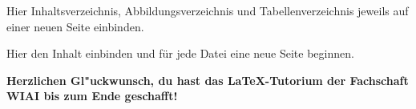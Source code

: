 
%



%

\setcounter{page}{2}

Hier Inhaltsverzeichnis, Abbildungsverzeichnis und Tabellenverzeichnis jeweils auf einer neuen Seite einbinden.



\setcounter{page}{1}

Hier den Inhalt einbinden und für jede Datei eine neue Seite beginnen.




\textbf{Herzlichen Gl"uckwunsch, du hast das \LaTeX -Tutorium der Fachschaft WIAI bis zum Ende geschafft!}


